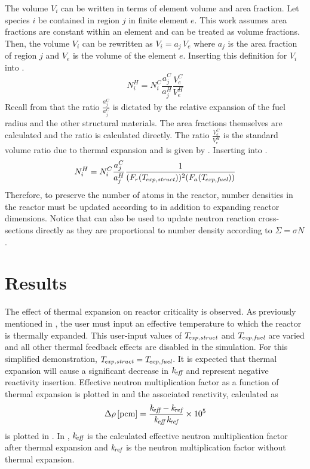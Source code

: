     The volume $V_i$ can be written in terms of element volume and area
    fraction. Let species $i$ be contained in region $j$ in finite element $e$. 
    This work assumes area fractions are constant within an element and can be
    treated as volume fractions. Then, the volume $V_i$ can be rewritten as 
    $V_i = a_j \, V_e$ where $a_j$ is the area fraction of region $j$ and $V_e$
    is the volume of the element $e$. Inserting this definition for $V_i$ into
    .
    \begin{equation}
      \label{eq:nden_expansion_expanded}
      N_i^H = N_i^C \frac{a_j^C}{a_j^H} \frac{V_e^C}{V_e^H}
    \end{equation}
    Recall from  that the
    ratio $\frac{a_j^C}{a_j^C}$ is dictated by the relative expansion of the
    fuel radius and the other structural materials. The area fractions
    themselves are calculated and the ratio is calculated directly. The 
    ratio $\frac{V_e^C}{V_e^H}$ is the standard volume ratio due to thermal 
    expansion and is given by . Inserting 
     into .
    \begin{equation}
      \label{eq:nden_thexp_update}
      N_i^H = N_i^C \frac{a_j^C}{a_j^H} 
        \frac{1}{(F_r(T_{\!\mbox{\scriptsize \em exp,struct}}))^2 (F_a({T_{\!\mbox{\scriptsize \em exp,fuel}}}))}
    \end{equation}
    Therefore, to preserve the number of atoms in the reactor, number densities
    in the reactor must be updated according to  in
    addition to expanding reactor dimensions. Notice that
     can also be used to update neutron reaction 
    cross-sections directly as they are proportional to number density according
    to $\Sigma = \sigma N$.

\section{Results}
  The effect of thermal expansion on reactor criticality is observed. As
  previously mentioned in , 
  the user must input an effective temperature to which the reactor is thermally 
  expanded. This user-input values of $T_{\!\mbox{\scriptsize \em exp,struct}}$ and ${T_{\!\mbox{\scriptsize \em exp,fuel}}}$ are varied 
  and all other thermal feedback effects are disabled in the simulation. For
  this simplified demonstration, $T_{\!\mbox{\scriptsize \em exp,struct}}={T_{\!\mbox{\scriptsize \em exp,fuel}}}$. It is 
  expected that thermal expansion will cause a significant decrease in $k_{\!\mbox{\scriptsize \em eff}}$ 
  and represent negative reactivity insertion. Effective neutron multiplication 
  factor as a function of thermal expansion is plotted in  
  and the associated reactivity, calculated as
  \begin{equation}
    \label{eq:reactivity_formula}
    \Delta \rho \left[\text{{pcm}}\right] = \frac{k_{\!\mbox{\scriptsize \em eff}} - k_{\!\mbox{\scriptsize \em ref}}}{k_{\!\mbox{\scriptsize \em eff}} \, k_{\!\mbox{\scriptsize \em ref}}} \times 10^5
  \end{equation}
  is plotted in . In
  , $k_{\!\mbox{\scriptsize \em eff}}$ is the calculated effective neutron 
  multiplication factor after thermal expansion and $k_{\!\mbox{\scriptsize \em ref}}$ is the neutron 
  multiplication factor without thermal expansion. 

